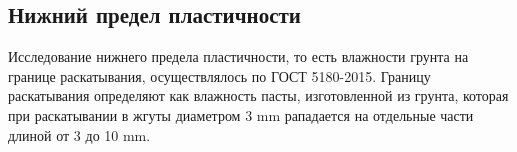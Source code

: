 


\subsection{Нижний предел пластичности}

Исследование нижнего предела пластичности, то есть влажности грунта на границе раскатывания, 
осуществлялось по ГОСТ 5180-2015. Границу раскатывания определяют как влажность пасты, 
изготовленной из грунта, которая при раскатывании  в жгуты диаметром 3 \si{\milli\meter} 
рападается на отдельные части длиной от 3 до 10 \si{\milli\meter}.


